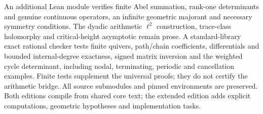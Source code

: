 An additional Lean module verifies finite Abel summation, rank-one determinants and genuine continuous operators, an infinite geometric majorant and necessary symmetry conditions. The dyadic arithmetic $\ell^2$ construction, trace-class holomorphy and critical-height asymptotic remain prose. A standard-library exact rational checker tests finite quivers, path/chain coefficients, differentials and bounded internal-degree exactness, signed matrix inversion and the weighted cycle determinant, including nodal, terminating, periodic and cancellation examples. Finite tests supplement the universal proofs; they do not certify the arithmetic bridge. All source submodules and pinned environments are preserved. Both editions compile from shared core text; the extended edition adds explicit computations, geometric hypotheses and implementation tasks.
